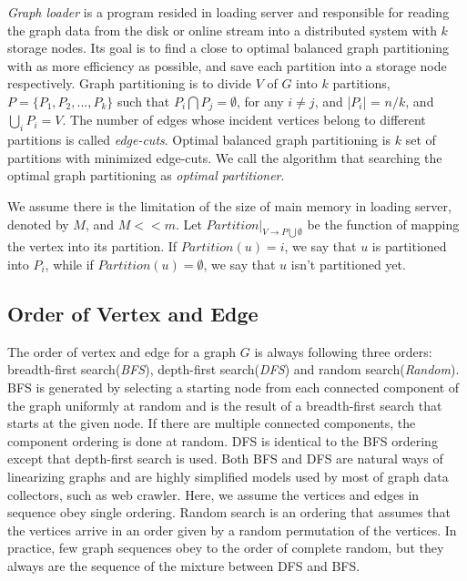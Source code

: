 \documentclass{sig-alternate-2013}
\begin{document}
\textit{Graph loader} is a program resided in loading server and responsible for reading the graph data from the disk or online stream into a distributed system with $k$ storage nodes. Its goal is to find a close to optimal balanced graph partitioning with as more efficiency as possible, and save each partition into a storage node respectively. Graph partitioning is to divide $V$ of $G$ into $k$ partitions, $P=\{P_1, P_2, ... , P_k\}$ such that $P_i \bigcap P_j = \emptyset$, for any $i\neq j$, and |$P_i$| = $n/k$, and ${\bigcup}_i P_i = V$. The number of edges whose incident vertices belong to different partitions is called \textit{edge-cuts}. Optimal balanced graph partitioning is $k$ set of partitions with minimized edge-cuts. We call the algorithm that searching the optimal graph partitioning as \textit{optimal partitioner}.


We assume there is the limitation of the size of main memory in loading server, denoted by $M$, and $M<<m$.
Let $Partition |_{V\rightarrow P\bigcup \emptyset}$ be the function of mapping the vertex into its partition. If $Partition(u)=i$, we say that $u$ is partitioned into $P_i$, while if $Partition(u)=\emptyset$, we say that $u$ isn't partitioned yet.


\subsection{Order of Vertex and Edge}\label{section-edge-order}

The order of vertex and edge for a graph $G$ is always following three orders: breadth-first search(\textit{BFS}), depth-first search(\textit{DFS}) and random search(\textit{Random}). BFS is generated by selecting a starting node from each connected component of the graph uniformly at random and is the result of a breadth-first search that starts at the given node. If there are multiple connected components, the component ordering is done at random. DFS is identical to the BFS ordering except that depth-first search is used. Both BFS and DFS are natural ways of linearizing graphs and are highly simplified models used by most of graph data collectors, such as web crawler. Here, we assume the vertices and edges in sequence obey single ordering. Random search is an ordering that assumes that the vertices arrive in an order given by a random permutation of the vertices. In practice, few graph sequences obey to the order of complete random, but they always are the sequence of the mixture between DFS and BFS.
\end{document}
